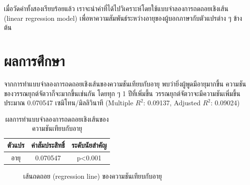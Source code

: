 \documentclass[a4paper]{article}
\begin{document}
    เมื่อวัดค่าทั้งสองเรียบร้อยแล้ว เราจะนำค่าที่ได้ไปวิเคราะห์โดยใช้แบบจำลองการถดถอยเชิงเส้น (linear regression model) เพื่อหาความสัมพันธ์ระหว่างอายุของผู้บอกภาษากับตัวแปรต่าง ๆ ข้างต้น
\section{ผลการศึกษา}
    จากการทำแบบจําลองการถดถอยเชิงเส้นของความชันเทียบกับอายุ พบว่ายิ่งผู้พูดมีอายุมากขึ้น ความชันของวรรณยุกต์จัตวาก็จะมากขึ้นเช่นกัน โดยทุก ๆ 1 ปีที่เพิ่มขึ้น วรรณยุกต์จัตวาจะมีความชันเพิ่มขึ้นประมาณ 0.070547 เซมิโทน/มิลลิวินาที (Multiple $R^2$: 0.09137, Adjusted $R^2$: 0.09024)
    \begin{table}[!ht]
        \begin{center}
        \begin{tabular}{|c|c|c|}
            \hline
            \textbf{ตัวแปร} & \textbf{ค่าสัมประสิทธิ์} & \textbf{ระดับนัยสำคัญ} \\
            \hline
            อายุ & 0.070547 & p<0.001 \\
            \hline
        \end{tabular}
        \end{center}
        \caption{ผลการทำแบบจำลองการถดถอยเชิงเส้นของความชันเทียบกับอายุ}
    \end{table}
    \begin{figure}[!ht]
        \begin{center}
        \end{center}
        \caption{เส้นถดถอย (regression line) ของความชันเทียบกับอายุ}
    \end{figure}
\end{document}
